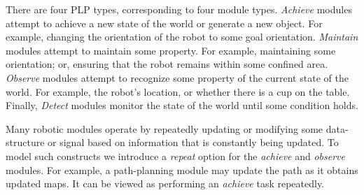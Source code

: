\documentclass[ 5p, 12pt, times, twocolumn, sort&compress ]{elsarticle}
\newcommand\mNote[1]{\todo[inline, author=Michael, color=cyan]{#1}}
\newcommand\rNote[1]{\todo[inline, author=Ronen, color=yellow]{#1}}
\begin{document}
There are four PLP types, corresponding to four module types. {\em Achieve} modules attempt to achieve a new state of the world
or generate a new object. For example, changing the orientation of the robot to some goal orientation. {\em Maintain} modules attempt to maintain some property. For example, maintaining some orientation; or, ensuring that the robot remains within some confined area. 
{\em Observe}  modules  attempt to recognize some property of the current state of the world. For example, the robot's location, or whether there is a cup on the table.
Finally,  {\em Detect\/} modules monitor the state of the world until some condition holds.

Many robotic modules operate by repeatedly updating or modifying some data-structure or signal based on information that is
constantly being updated.
To model such constructs we introduce a {\em repeat\/} option for the {\em achieve\/} and {\em observe\/} modules. 
For example, 
a path-planning module may update the path as it obtains updated maps. It can be viewed as performing an {\em achieve\/} task repeatedly.%
\end{document}
